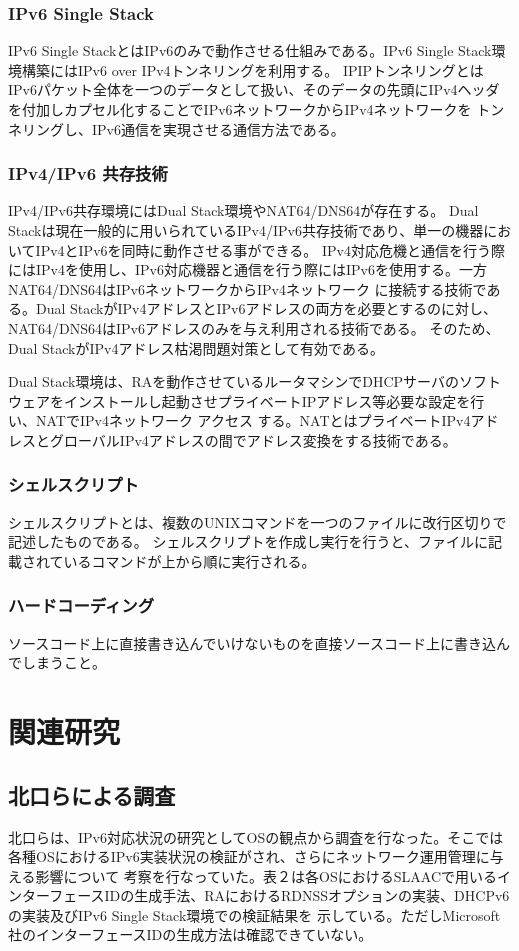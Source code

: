 \documentclass[a4j]{jarticle}
\begin{document}
\subsubsection{IPv6 Single Stack}
IPv6 Single StackとはIPv6のみで動作させる仕組みである。IPv6 Single Stack環境構築にはIPv6 over IPv4トンネリングを利用する。
IPIPトンネリングとはIPv6パケット全体を一つのデータとして扱い、そのデータの先頭にIPv4ヘッダを付加しカプセル化することでIPv6ネットワークからIPv4ネットワークを
トンネリングし、IPv6通信を実現させる通信方法である。

\subsubsection{IPv4/IPv6 共存技術}
IPv4/IPv6共存環境にはDual Stack環境やNAT64/DNS64が存在する。
Dual Stackは現在一般的に用いられているIPv4/IPv6共存技術であり、単一の機器においてIPv4とIPv6を同時に動作させる事ができる。
IPv4対応危機と通信を行う際にはIPv4を使用し、IPv6対応機器と通信を行う際にはIPv6を使用する。一方NAT64/DNS64はIPv6ネットワークからIPv4ネットワーク
に接続する技術である。Dual StackがIPv4アドレスとIPv6アドレスの両方を必要とするのに対し、NAT64/DNS64はIPv6アドレスのみを与え利用される技術である。
そのため、Dual StackがIPv4アドレス枯渇問題対策として有効である。

Dual Stack環境は、RAを動作させているルータマシンでDHCPサーバのソフトウェアをインストールし起動させプライベートIPアドレス等必要な設定を行い、NATでIPv4ネットワーク
アクセス
する。NATとはプライベートIPv4アドレスとグローバルIPv4アドレスの間でアドレス変換をする技術である。
\subsubsection{シェルスクリプト}
シェルスクリプトとは、複数のUNIXコマンドを一つのファイルに改行区切りで記述したものである。
シェルスクリプトを作成し実行を行うと、ファイルに記載されているコマンドが上から順に実行される。

\subsubsection{ハードコーディング}
ソースコード上に直接書き込んでいけないものを直接ソースコード上に書き込んでしまうこと。
\newpage
\section{関連研究} %
\subsection{北口らによる調査}
北口らは、IPv6対応状況の研究としてOSの観点から調査を行なった。そこでは各種OSにおけるIPv6実装状況の検証がされ、さらにネットワーク運用管理に与える影響について
考察を行なっていた。表２は各OSにおけるSLAACで用いるインターフェースIDの生成手法、RAにおけるRDNSSオプションの実装、DHCPv6の実装及びIPv6 Single Stack環境での検証結果を
示している。ただしMicrosoft社のインターフェースIDの生成方法は確認できていない。
\end{document}
